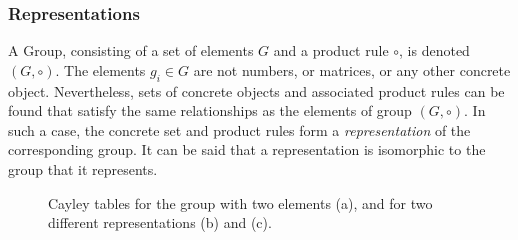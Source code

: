 \subsubsection{Representations}\label{sec:representations}
A Group, consisting of a set of elements $G$ and a product rule $\circ$, is denoted $(G,\circ)$. 
The elements $g_i\in G$ are not numbers, or matrices, or any other concrete object.
Nevertheless, sets of concrete objects and associated product rules can be found that satisfy the same relationships as the elements of group $(G,\circ)$.
In such a case, the concrete set and product rules form a \emph{representation} of the corresponding group.
It can be said that a representation is isomorphic to the group that it represents.

\begin{figure}[h!]
\captionsetup[subfigure]{position=b}
\centering
{}
\caption{Cayley tables for the group with two elements (a), and for two different representations (b) and (c).}
\label{tab:representations}
\end{figure}

